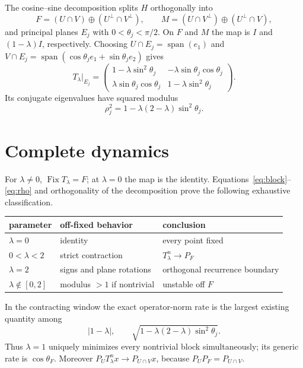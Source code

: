 \documentclass[9pt]{extarticle}
\begin{document}
The cosine--sine decomposition splits $H$ orthogonally into
\[
 F=(U\cap V)\oplus(U^\perp\cap V^\perp),\qquad
 M=(U\cap V^\perp)\oplus(U^\perp\cap V),
\]
and principal planes $E_j$ with $0<\theta_j<\pi/2$.  On $F$ and $M$ the map is
$I$ and $(1-\lambda)I$, respectively.  Choosing
$U\cap E_j=\operatorname{span}(e_1)$ and
$V\cap E_j=\operatorname{span}(\cos\theta_j e_1+\sin\theta_j e_2)$ gives
\begin{equation}\label{eq:block}
 T_\lambda|_{E_j}=\begin{pmatrix}
 1-\lambda\sin^2\theta_j&-\lambda\sin\theta_j\cos\theta_j\\
 \lambda\sin\theta_j\cos\theta_j&1-\lambda\sin^2\theta_j
 \end{pmatrix}.
\end{equation}
Its conjugate eigenvalues have squared modulus
\begin{equation}\label{eq:rho}
 \rho_j^2=1-\lambda(2-\lambda)\sin^2\theta_j.
\end{equation}

\section{Complete dynamics}
For $\lambda\ne0$, $\operatorname{Fix}T_\lambda=F$; at $\lambda=0$ the map is
the identity.  Equations~\eqref{eq:block}--\eqref{eq:rho} and orthogonality of
the decomposition prove the following exhaustive classification.
\begin{center}
\begin{tabular}{@{}lll@{}}\toprule
parameter & off-fixed behavior & conclusion\\ \midrule
$\lambda=0$ & identity & every point fixed\\
$0<\lambda<2$ & strict contraction & $T_\lambda^n\to P_F$\\
$\lambda=2$ & signs and plane rotations & orthogonal recurrence boundary\\
$\lambda\notin[0,2]$ & modulus $>1$ if nontrivial & unstable off $F$\\ \bottomrule
\end{tabular}
\end{center}
In the contracting window the exact operator-norm rate is the largest existing
quantity among
\[
 |1-\lambda|,\qquad
 \sqrt{1-\lambda(2-\lambda)\sin^2\theta_j}.
\]
Thus $\lambda=1$ uniquely minimizes every nontrivial block simultaneously; its
generic rate is $\cos\theta_F$.  Moreover
$P_UT_\lambda^n x\to P_{U\cap V}x$, because $P_UP_F=P_{U\cap V}$.
\end{document}
